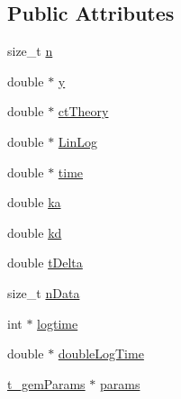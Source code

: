 \subsection*{\-Public \-Attributes}
\begin{DoxyCompactItemize}
\item 
size\-\_\-t \hyperlink{structgemFitData_a9fad71c15a8f6006c28d712d70ec558c}{n}
\item 
double $\ast$ \hyperlink{structgemFitData_a81db7ce60f65b7f32ae24828fb8f00d7}{y}
\item 
double $\ast$ \hyperlink{structgemFitData_a4ebd510f1710859d25247576bf4741dd}{ct\-Theory}
\item 
double $\ast$ \hyperlink{structgemFitData_a545989a23e41b3354f21f45bede5cc76}{\-Lin\-Log}
\item 
double $\ast$ \hyperlink{structgemFitData_a20002bb0b7018d16f7b8afc0f008cc48}{time}
\item 
double \hyperlink{structgemFitData_aca87aa3e7c6b283f1308655cef5d01b3}{ka}
\item 
double \hyperlink{structgemFitData_adbda8e4983eb12fec050fdb2acdafd29}{kd}
\item 
double \hyperlink{structgemFitData_a2e6946eb0ab122c4af2001d096b3dfbf}{t\-Delta}
\item 
size\-\_\-t \hyperlink{structgemFitData_af4c06d46d81afc9ab9a016ab69d03067}{n\-Data}
\item 
int $\ast$ \hyperlink{structgemFitData_aa2acbf4a9506f51299b1ad754cd5a854}{logtime}
\item 
double $\ast$ \hyperlink{structgemFitData_a89d045633c7b56b764955aac0315e4c8}{double\-Log\-Time}
\item 
\hyperlink{structt__gemParams}{t\-\_\-gem\-Params} $\ast$ \hyperlink{structgemFitData_a1a4c58b225c31c202c4d3d494758a769}{params}
\end{DoxyCompactItemize}


